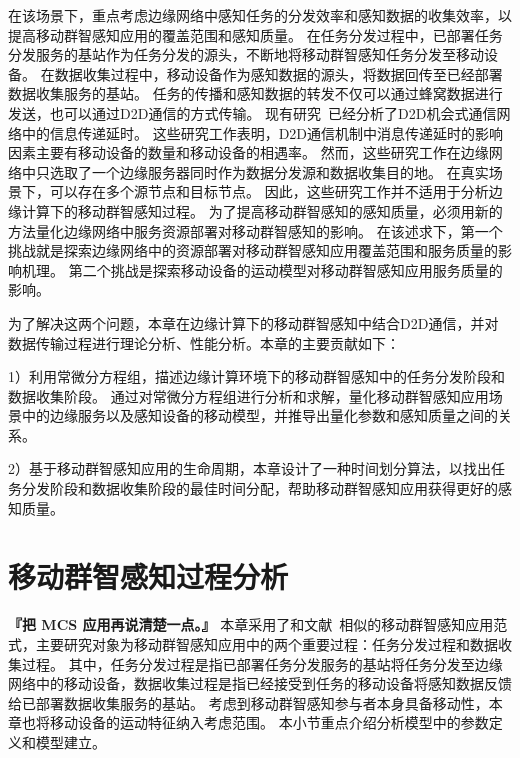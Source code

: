 在该场景下，重点考虑边缘网络中感知任务的分发效率和感知数据的收集效率，以提高移动群智感知应用的覆盖范围和感知质量。
在任务分发过程中，已部署任务分发服务的基站作为任务分发的源头，不断地将移动群智感知任务分发至移动设备。
在数据收集过程中，移动设备作为感知数据的源头，将数据回传至已经部署数据收集服务的基站。
任务的传播和感知数据的转发不仅可以通过蜂窝数据进行发送，也可以通过D2D通信的方式传输。
现有研究~\cite{DBLP:conf/wcnc/QinF13,DBLP:journals/twc/LiW14,DBLP:journals/winet/ZhaoMLT18}已经分析了D2D机会式通信网络中的信息传递延时。
这些研究工作表明，D2D通信机制中消息传递延时的影响因素主要有移动设备的数量和移动设备的相遇率。
然而，这些研究工作在边缘网络中只选取了一个边缘服务器同时作为数据分发源和数据收集目的地。
在真实场景下，可以存在多个源节点和目标节点。
因此，这些研究工作并不适用于分析边缘计算下的移动群智感知过程。
为了提高移动群智感知的感知质量，必须用新的方法量化边缘网络中服务资源部署对移动群智感知的影响。
在该述求下，第一个挑战就是探索边缘网络中的资源部署对移动群智感知应用覆盖范围和服务质量的影响机理。
第二个挑战是探索移动设备的运动模型对移动群智感知应用服务质量的影响。

为了解决这两个问题，本章在边缘计算下的移动群智感知中结合D2D通信，并对数据传输过程进行理论分析、性能分析。本章的主要贡献如下：

1）利用常微分方程组，描述边缘计算环境下的移动群智感知中的任务分发阶段和数据收集阶段。
通过对常微分方程组进行分析和求解，量化移动群智感知应用场景中的边缘服务以及感知设备的移动模型，并推导出量化参数和感知质量之间的关系。


2）基于移动群智感知应用的生命周期，本章设计了一种时间划分算法，以找出任务分发阶段和数据收集阶段的最佳时间分配，帮助移动群智感知应用获得更好的感知质量。


\section{移动群智感知过程分析}


\textbf{『把 MCS 应用再说清楚一点。』}
本章采用了和文献~\cite{DBLP:journals/tpds/ZhaoMTL15}相似的移动群智感知应用范式，主要研究对象为移动群智感知应用中的两个重要过程：任务分发过程和数据收集过程。
其中，任务分发过程是指已部署任务分发服务的基站将任务分发至边缘网络中的移动设备，数据收集过程是指已经接受到任务的移动设备将感知数据反馈给已部署数据收集服务的基站。
考虑到移动群智感知参与者本身具备移动性，本章也将移动设备的运动特征纳入考虑范围。
本小节重点介绍分析模型中的参数定义和模型建立。

